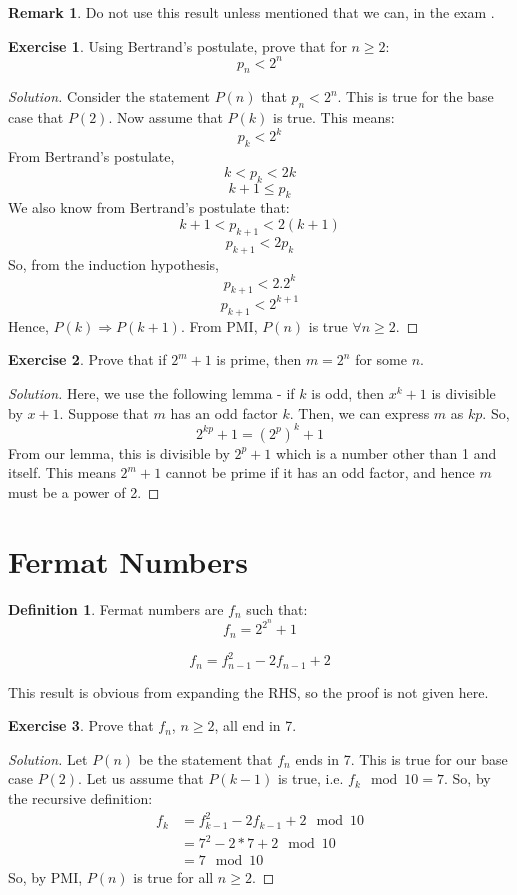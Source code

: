 \documentclass[12pt,letterpaper]{amsbook}
\theoremstyle{definition}
\newtheorem{definition}{Definition} %
\newtheorem*{remark}{Remark}
\newtheorem*{exercise}{Exercise}
\newenvironment{solution}
  {\renewcommand\qedsymbol{$\blacksquare$}\begin{proof}[Solution]}
  {\end{proof}}
\begin{document}
\begin{remark}
  Do not use this result unless mentioned that we can, in the exam .
\end{remark}

\begin{exercise}
  Using Bertrand's postulate, prove that for $n \geq 2$:
  \[p_n < 2^n\]
\end{exercise}

\begin{solution}
  Consider the statement $P(n)$ that $p_n < 2^n$. This is true for the base case that $P(2)$. Now assume that $P(k)$ is true. This means:
  \[p_k < 2^k\]
  From Bertrand's postulate,
  \[k < p_k < 2k\]
  \[k+1 \leq p_k \]
  We also know from Bertrand's postulate that:
  \[k+1 < p_{k+1} < 2(k+1)\]
  \[p_{k+1} < 2p_k\]
  So, from the induction hypothesis,
  \[p_{k+1} < 2.2^k\]
  \[p_{k+1} < 2^{k+1}\]
  Hence, $P(k) \Rightarrow P(k+1)$. From PMI, $P(n)$ is true $\forall n \geq 2$.
\end{solution}
\begin{exercise}
  Prove that if $2^{m}+1$ is prime, then $m = 2^n$ for some $n$.
\end{exercise}
\begin{solution}
  Here, we use the following lemma - if $k$ is odd, then $x^k+1$ is divisible by $x+1$.
  Suppose that $m$ has an odd factor $k$. Then, we can express $m$ as $kp$. So,
  \[2^{kp}+1 = (2^{p})^k + 1\]
  From our lemma, this is divisible by $2^p+1$ which is a number other than 1 and itself. This means $2^m+1$ cannot be prime if it has an odd factor, and hence $m$ must be a power of 2.
\end{solution}

\section{Fermat Numbers}

\begin{definition}
  Fermat numbers are $f_n$ such that:
  \[f_n = 2^{2^n}+1\]
\end{definition}

\begin{lemma}
  \[f_n = f_{n-1}^2 - 2f_{n-1} + 2\]
\end{lemma}

This result is obvious from expanding the RHS, so the proof is not given here.

\begin{exercise}
  Prove that $f_n$, $n \geq 2$, all end in 7.
\end{exercise}
\begin{solution}
  Let $P(n)$ be the statement that $f_n$ ends in 7. This is true for our base case $P(2)$. Let us assume that $P(k-1)$ is true, i.e. $f_k \mod 10 = 7$. So, by the recursive definition:
  \begin{align*}
    f_k &= f_{k-1}^2 - 2f_{k-1} + 2 \mod 10 \\
        &= 7^2 - 2* 7 + 2 \mod 10 \\
        &= 7 \mod 10
  \end{align*}
  So, by PMI, $P(n)$ is true for all $n \geq 2$.
\end{solution}
\end{document}
